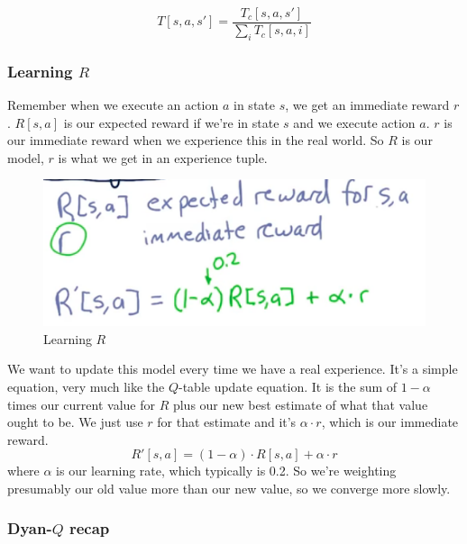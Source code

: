 \documentclass[12pt]{article}
\begin{document}
\begin{equation}
T[s, a, s'] = \frac{T_c[s, a, s']}{\sum_i T_c[s, a, i]}
\end{equation}

\subsubsection{Learning $R$}

Remember when we execute an action $a$ in state $s$, we get an immediate reward $r$. $R[s, a]$ is our expected reward if we're in state $s$ and we execute action $a$. $r$ is our immediate reward when we experience this in the real world. So $R$ is our model, $r$ is what we get in an experience tuple. 

\begin{figure}[!ht]
\centering
\includegraphics[scale=0.4]{fig/fig116}
\caption{Learning $R$}
\end{figure}

We want to update this model every time we have a real experience. It's a simple equation, very much like the $Q$-table update equation. It is the sum of $1-\alpha$ times our current value for $R$ plus our new best estimate of what that value ought to be. We just use $r$ for that estimate and it's $\alpha\cdot r$, which is our immediate reward. 
\begin{equation}
R'[s, a] = (1-\alpha)\cdot R[s, a] + \alpha\cdot r
\end{equation}
where $\alpha$ is our learning rate, which typically is 0.2. So we're weighting presumably our old value more than our new value, so we converge more slowly. 

\subsubsection{Dyan-$Q$ recap}
\end{document}

